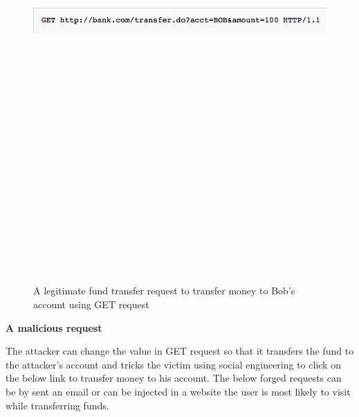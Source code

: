 \begin{figure}[htb]
\centering
\includegraphics[width=16cm,height=20cm,keepaspectratio]{image/csrf1.png}
\caption[Cross-site request frogery attack]{A legitimate fund transfer request to transfer money to Bob's account using GET request ~\cite{g20}} 
\label{fig:csrf1}
\end{figure}

\bigskip

{\bf A malicious request}

The attacker can change the value in GET request so that it transfers the fund to the attacker's account and tricks the victim using social engineering to click on the below link to transfer money to his account.
The below forged requests can be by sent an email or can be injected in a website the user is most likely to visit while transferring funds.
\bigskip

